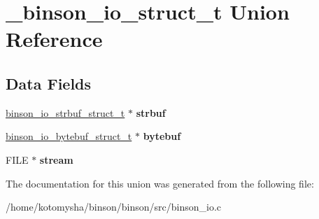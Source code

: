 \hypertarget{union__binson__io__struct__t}{\section{\-\_\-binson\-\_\-io\-\_\-struct\-\_\-t Union Reference}
\label{union__binson__io__struct__t}
}
\subsection*{Data Fields}
\begin{DoxyCompactItemize}
\item 
\hypertarget{union__binson__io__struct__t_a0c12bd5c2effe8fa1538ceaf7d84ce06}{\hyperlink{struct__binson__io__strbuf__struct__t}{binson\-\_\-io\-\_\-strbuf\-\_\-struct\-\_\-t} $\ast$ {\bfseries strbuf}}\label{union__binson__io__struct__t_a0c12bd5c2effe8fa1538ceaf7d84ce06}

\item 
\hypertarget{union__binson__io__struct__t_af870d45cc62b5797057cd18db0c8cb9a}{\hyperlink{struct__binson__io__bytebuf__struct__t}{binson\-\_\-io\-\_\-bytebuf\-\_\-struct\-\_\-t} $\ast$ {\bfseries bytebuf}}\label{union__binson__io__struct__t_af870d45cc62b5797057cd18db0c8cb9a}

\item 
\hypertarget{union__binson__io__struct__t_a867a8cb54d3231f2acbfaa44fb31d6c4}{F\-I\-L\-E $\ast$ {\bfseries stream}}\label{union__binson__io__struct__t_a867a8cb54d3231f2acbfaa44fb31d6c4}

\end{DoxyCompactItemize}


The documentation for this union was generated from the following file\-:\begin{DoxyCompactItemize}
\item 
/home/kotomysha/binson/binson/src/binson\-\_\-io.\-c\end{DoxyCompactItemize}

